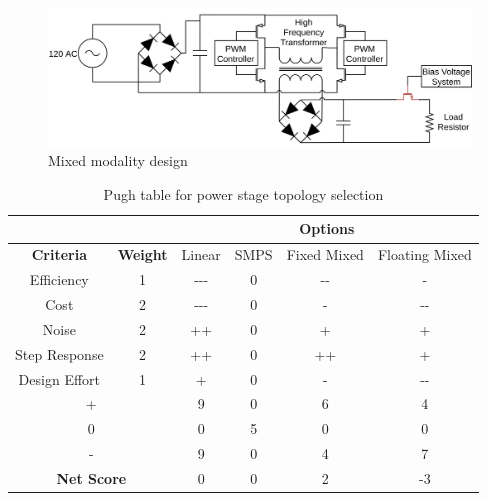 \documentclass{article}
\begin{document}
\begin{figure}[H]
    \includegraphics[width=\textwidth]{mixed}
    \caption{Mixed modality design}
    \label{fig:mixed}
\end{figure}
\begin{table}[H]
    \centering
\begin{tabular}{ |c|c||c|c|c|c|  }
    \cline{3-6}
    \multicolumn{1}{c}{}& \multicolumn{1}{c}{}&  \multicolumn{4}{|c|}{\textbf{Options}} \\
    \hline
    \textbf{Criteria} & \textbf{Weight} & Linear & SMPS & Fixed Mixed & Floating Mixed \\ 
    \hline
    Efficiency & 1 & {-}{-}{-} & 0 & {-}{-} & - \\
    Cost & 2 & {-}{-}{-} & 0 & {-} & {-}{-} \\
    Noise & 2 & ++ & 0 & + & + \\
    Step Response & 2 & ++ & 0 & ++ & + \\
    Design Effort & 1 & + & 0 & - & {-}{-} \\ 
    \hline
    \hline
    \multicolumn{2}{|c||}{+} & 9 & 0 & 6 & 4\\
    \multicolumn{2}{|c||}{0} & 0 & 5 & 0 & 0\\
    \multicolumn{2}{|c||}{-} & 9 & 0 & 4 & 7\\
    \hline
    \hline
    \multicolumn{2}{|c||}{\textbf{Net Score}} & 0 & 0 & 2 & -3\\
    \hline
\end{tabular}
\caption{Pugh table for power stage topology selection}
\label{tab:power}
\end{table}
\end{document}
